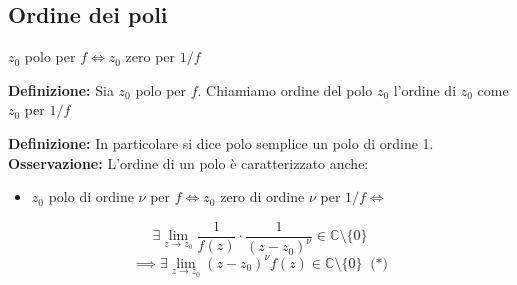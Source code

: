 \documentclass[a4paper]{article}
\newcommand{\C}{\mathbb{C}}
\begin{document}
\subsection{Ordine dei poli}
$z_0$ polo per $f\iff z_0$ zero per $1 / f$
\begin{tcolorbox}	
\textbf{Definizione:} Sia $z_0$ polo per $f$. Chiamiamo ordine del polo $z_0$ l'ordine di $z_0$ come $z_0$ per $1 / f$
\end{tcolorbox}
\textbf{Definizione: }In particolare si dice polo semplice un polo di ordine 1.
\textbf{Osservazione:} L'ordine di un polo è caratterizzato anche:
\begin{itemize}
	\item $z_0$ polo di ordine $\nu$ per $f \iff z_0$ zero di ordine $\nu$ per $1 / f\iff$
\end{itemize}
		\[\exists \lim_{z \to z_0} \frac{1}{f(z)}\cdot \frac{1}{(z-z_0)^\nu}\in\C\setminus \{0\}\]
		\[\implies \exists \lim_{z \to z_0} (z-z_0)^\nu f(z)\in\C\setminus \{0\} \ \text{ (*)}\]
\end{document}
